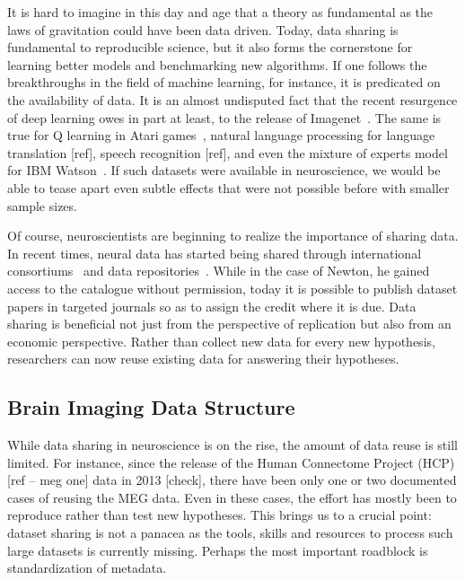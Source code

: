 It is hard to imagine in this day and age that a theory as fundamental as the laws of gravitation could have been data driven. Today, data sharing is fundamental to reproducible science, but it also forms the cornerstone for learning better models and benchmarking new algorithms. If one follows the breakthroughs in the field of machine learning, for instance, it is predicated on the availability of data. It is an almost undisputed fact that the recent resurgence of deep learning owes in part at least, to the release of Imagenet~\citep{deng2009imagenet}. The same is true for Q learning in Atari games~\citep{watkins1992q, bellemare2013arcade}, natural language processing for language translation [ref], speech recognition [ref], and even the mixture of experts model~\citep{jacobs1991adaptive} for IBM Watson~\citep{ferrucci2010building}. If such datasets were available in neuroscience, we would be able to tease apart even subtle effects that were not possible before with smaller sample sizes.

Of course, neuroscientists are beginning to realize the importance of sharing data. In recent times, neural data has started being shared through international consortiums~\citep{van2013wu, ollier2005uk} and data repositories~\citep{poldrack2013toward, gorgolewski2015neurovault}. While in the case of Newton, he gained access to the catalogue without permission, today it is possible to publish dataset papers in targeted journals so as to assign the credit where it is due.
Data sharing is beneficial not just from the perspective of replication but also from an economic perspective. Rather than collect new data for every new hypothesis, researchers can now reuse existing data for answering their hypotheses.

\subsection{Brain Imaging Data Structure}

While data sharing in neuroscience is on the rise, the amount of data reuse is still limited. For instance, since the release of the Human Connectome Project (HCP) [ref -- meg one] data in 2013 [check], there have been only one or two documented cases of reusing the MEG data. Even in these cases, the effort has mostly been to reproduce rather than test new hypotheses. This brings us to a crucial point: dataset sharing is not a panacea as the tools, skills and resources to process such large datasets is currently missing. Perhaps the most important roadblock is standardization of metadata. 

